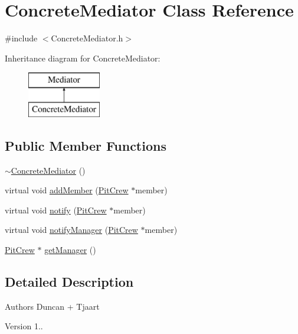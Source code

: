 \hypertarget{class_concrete_mediator}{}\section{Concrete\+Mediator Class Reference}
\label{class_concrete_mediator}


{\ttfamily \#include $<$Concrete\+Mediator.\+h$>$}

Inheritance diagram for Concrete\+Mediator\+:\begin{figure}[H]
\begin{center}
\leavevmode
\includegraphics[height=2.000000cm]{class_concrete_mediator}
\end{center}
\end{figure}
\subsection*{Public Member Functions}
\begin{DoxyCompactItemize}
\item 
\mbox{\hyperlink{class_concrete_mediator_a62241708f7b293eafb48064e0dd22f2f}{$\sim$\+Concrete\+Mediator}} ()
\item 
virtual void \mbox{\hyperlink{class_concrete_mediator_a81de115027a7180658925a2d2175e08f}{add\+Member}} (\mbox{\hyperlink{class_pit_crew}{Pit\+Crew}} $\ast$member)
\item 
virtual void \mbox{\hyperlink{class_concrete_mediator_aea62657783ed54f1152fe129e4adc8d3}{notify}} (\mbox{\hyperlink{class_pit_crew}{Pit\+Crew}} $\ast$member)
\item 
virtual void \mbox{\hyperlink{class_concrete_mediator_ac4a804e3f7f6a74240ae249cf1f315ec}{notify\+Manager}} (\mbox{\hyperlink{class_pit_crew}{Pit\+Crew}} $\ast$member)
\item 
\mbox{\hyperlink{class_pit_crew}{Pit\+Crew}} $\ast$ \mbox{\hyperlink{class_concrete_mediator_ab205ed278eb15b884e4d9441992b5b20}{get\+Manager}} ()
\end{DoxyCompactItemize}


\subsection{Detailed Description}
\begin{DoxyAuthor}{Authors}
Duncan + Tjaart 
\end{DoxyAuthor}
\begin{DoxyVersion}{Version}
1.. 
\end{DoxyVersion}


